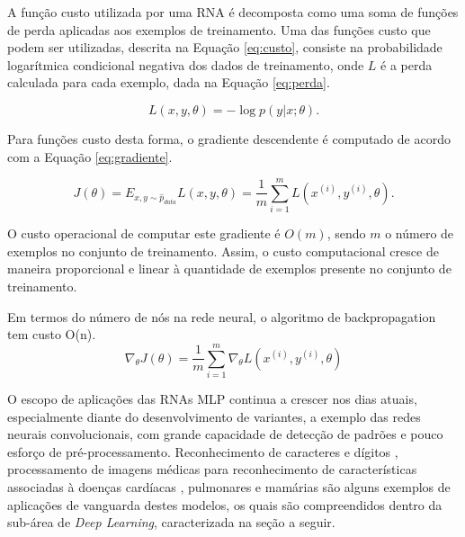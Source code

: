 A função custo utilizada por uma RNA é decomposta como uma soma de funções de perda aplicadas aos exemplos de treinamento. Uma das funções custo que podem ser utilizadas, descrita na Equação \ref{eq:custo}, consiste na probabilidade logarítmica condicional negativa dos dados de treinamento, onde $L$ é a perda calculada para cada exemplo, dada na Equação \ref{eq:perda}.

\begin{equation}\label{eq:perda}
	L(x, y, \theta) = - \log p (y|x;\theta).
\end{equation}

Para funções custo desta forma, o gradiente descendente é computado de acordo com a Equação
\ref{eq:gradiente}.

\begin{equation}\label{eq:custo}
J(\theta) = E_{x,y \sim \hat{p}_{data}} L(x, y, \theta) = \frac{1}{m} \sum_{i=1}^{m} L(x^{(i)}, y^{(i)}, \theta).
\end{equation}

O custo operacional de computar este gradiente é $O(m)$, sendo $m$ o número de exemplos no conjunto de treinamento. Assim, o custo computacional cresce de maneira proporcional e linear à quantidade de exemplos presente no conjunto de treinamento.

Em termos do número de nós na rede neural, o algoritmo de backpropagation tem custo O(n).
\begin{equation}\label{eq:gradiente}
	\nabla_{\theta} J(\theta) = \frac{1}{m} \sum_{i=1}^{m} \nabla_{\theta} L(x^{(i)}, y^{(i)}, \theta)
\end{equation}

\fi

O escopo de aplicações das RNAs MLP continua a crescer nos dias atuais, especialmente diante do desenvolvimento de variantes, a exemplo das redes neurais convolucionais, com grande capacidade de detecção de padrões e pouco esforço de pré-processamento. Reconhecimento de caracteres e dígitos  \cite{lenet}, processamento de imagens médicas para reconhecimento de características associadas à doenças cardíacas \cite{oktay2018anatomically}, pulmonares \cite{mingchen2018holistic} e mamárias \cite{dubrovina2018mammography} são alguns exemplos de aplicações de vanguarda destes modelos, os quais são compreendidos dentro da sub-área de \emph{Deep Learning}, caracterizada na seção a seguir.
